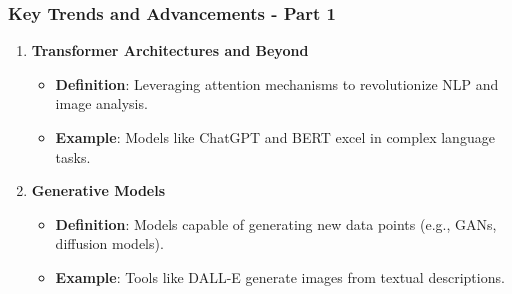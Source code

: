 \documentclass[aspectratio=169]{beamer}
\begin{document}
\begin{frame}[fragile]
    \frametitle{Key Trends and Advancements - Part 1}
    \begin{enumerate}
        \item \textbf{Transformer Architectures and Beyond}
            \begin{itemize}
                \item \textbf{Definition}: Leveraging attention mechanisms to revolutionize NLP and image analysis.
                \item \textbf{Example}: Models like ChatGPT and BERT excel in complex language tasks.
            \end{itemize}
            
        \item \textbf{Generative Models}
            \begin{itemize}
                \item \textbf{Definition}: Models capable of generating new data points (e.g., GANs, diffusion models).
                \item \textbf{Example}: Tools like DALL-E generate images from textual descriptions.
            \end{itemize}
    \end{enumerate}
\end{frame}
\end{document}
